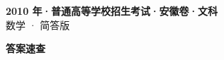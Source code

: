 \documentclass[zihao=-4, a4paper]{ctexart}
\begin{document}
\begin{center}
  {\Large\bfseries 2010 年·普通高等学校招生考试·安徽卷·文科}\\[4pt]
  {\large 数学 · 简答版}
\end{center}
\medskip
{}

\clearpage
{}
\begin{center}{\Large\bfseries 答案速查}\end{center}
\medskip

\end{document}
